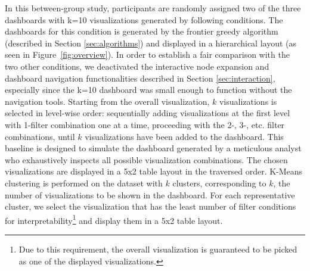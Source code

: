 \par In this between-group study, participants are randomly assigned two of the three dashboards with k=10 visualizations generated by following conditions. 
\stitle{\system:} The dashboards for this condition is generated by the frontier greedy algorithm (described in Section \ref{sec:algorithms}) and displayed in a hierarchical layout (as seen in Figure~\ref{fig:overview}). In order to establish a fair comparison with the two other conditions, we deactivated the interactive node expansion and dashboard navigation functionalities described in Section \ref{sec:interaction}, especially since the k=10 dashboard was small enough to function without the navigation tools.
\stitle{\BFS:} Starting from the overall visualization, $k$ visualizations is selected in level-wise order: sequentially adding visualizations at the first level with 1-filter combination one at a time, proceeding with the 2-, 3-, etc. filter combinations, until $k$ visualizations have been added to the dashboard. This baseline is designed to simulate the dashboard generated by a meticulous analyst who exhaustively inspects all possible visualization combinations. The chosen visualizations are displayed in a 5x2 table layout in the traversed order.
\stitle{\cluster:} K-Means clustering is performed on the dataset with $k$ clusters, corresponding to $k$, the number of visualizations to be shown in the dashboard. For each representative cluster, we select the visualization that has the least number of filter conditions for interpretability\footnote{Due to this requirement, the overall visualization is guaranteed to be picked as one of the displayed visualizations.} and display them in a 5x2 table layout.


